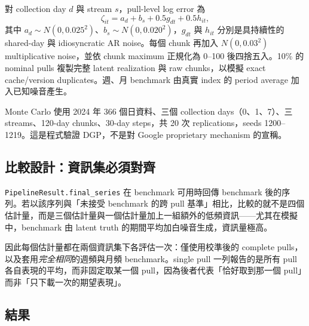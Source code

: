 \documentclass[12pt,a4paper,oneside]{article}
\begin{document}
對 collection day $d$ 與 stream $s$，pull-level log error 為
\begin{equation}
\zeta_{it}=a_d+b_s+0.5g_{dt}+0.5h_{it},
\end{equation}
其中 $a_d\sim N(0,0.025^2)$、$b_s\sim N(0,0.020^2)$，$g_{dt}$ 與 $h_{it}$ 分別是具持續性的 shared-day 與 idiosyncratic AR noise。每個 chunk 再加入 $N(0,0.03^2)$ multiplicative noise，並依 chunk maximum 正規化為 0--100 後四捨五入。10\% 的 nominal pulls 複製完整 latent realization 與 raw chunks，以模擬 exact cache/version duplicates。週、月 benchmark 由真實 index 的 period average 加入已知噪音產生。

Monte Carlo 使用 2024 年 366 個日資料、三個 collection days（0、1、7）、三 streams、120-day chunks、30-day steps，共 20 次 replications，seeds 1200--1219。這是程式驗證 DGP，不是對 Google proprietary mechanism 的宣稱。

\subsection{比較設計：資訊集必須對齊}

\texttt{PipelineResult.final\_series} 在 benchmark 可用時回傳 benchmark 後的序列。若以該序列與「未接受 benchmark 的跨 pull 基準」相比，比較的就不是四個估計量，而是三個估計量與一個估計量加上一組額外的低頻資訊——尤其在模擬中，benchmark 由 latent truth 的期間平均加白噪音生成，資訊量極高。

因此每個估計量都在兩個資訊集下各評估一次：僅使用校準後的 complete pulls，以及套用\emph{完全相同}的週頻與月頻 benchmark。single pull 一列報告的是所有 pull 各自表現的平均，而非固定取某一個 pull，因為後者代表「恰好取到那一個 pull」而非「只下載一次的期望表現」。

\subsection{結果}
\end{document}
